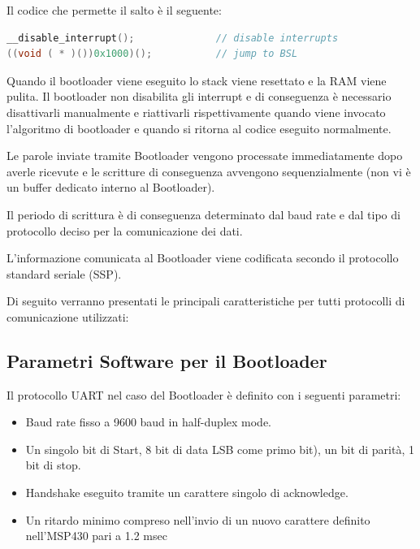 \documentclass[LaM,binding=0.6cm,oneside]{../sapthesis}
\begin{document}
Il codice che permette il salto è il seguente:

\newline

\begin{lstlisting}[language=C]
__disable_interrupt();              // disable interrupts
((void ( * )())0x1000)();           // jump to BSL
\end{lstlisting}

\newline

Quando il bootloader viene eseguito lo stack viene resettato e la RAM viene pulita. 
Il bootloader non disabilita gli interrupt e di conseguenza è necessario disattivarli manualmente e riattivarli rispettivamente quando viene invocato l’algoritmo di bootloader e quando si ritorna al codice eseguito normalmente.

Le parole inviate tramite Bootloader vengono processate immediatamente dopo averle ricevute e le scritture di conseguenza avvengono sequenzialmente (non vi è un buffer dedicato interno al Bootloader).

Il periodo di scrittura è di conseguenza determinato dal baud rate e dal tipo di protocollo deciso per la comunicazione dei dati.

L’informazione comunicata al Bootloader viene codificata secondo il protocollo standard seriale (SSP).

Di seguito verranno presentati le principali caratteristiche per tutti protocolli di comunicazione utilizzati:

\subsection{Parametri Software per il Bootloader}

Il protocollo UART nel caso del Bootloader è definito con i seguenti parametri:

\begin{itemize}
\item Baud rate fisso a 9600 baud in half-duplex mode.
\item  Un singolo bit di Start, 8 bit di data LSB come primo bit), un bit di parità, 1 bit di stop.
\item Handshake eseguito tramite un carattere singolo di acknowledge.
\item Un ritardo minimo compreso nell’invio di un nuovo carattere definito nell’MSP430 pari a 1.2 msec
\end{itemize}
\end{document}
